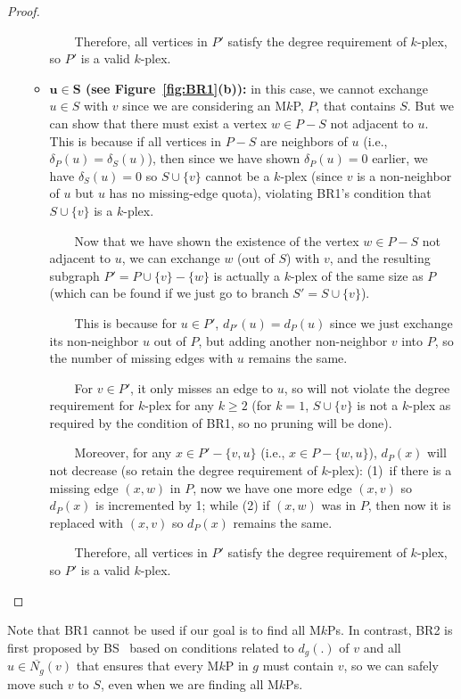 \documentclass[sigconf, nonacm]{acmart}
\begin{document}
\begin{proof}
\begin{itemize}
\begin{itemize}
\ \ \ \ Therefore, all vertices in $P'$ satisfy the degree requirement of $k$-plex, so $P'$ is a valid $k$-plex.

\item {\bf $\mathbf{u\in S}$ (see Figure~\ref{fig:BR1}(b)):} in this case, we cannot exchange $u\in S$ with $v$ since we are considering an M$k$P, $P$, that contains $S$. But we can show that there must exist a vertex $w\in P-S$ not adjacent to $u$. This is because if all vertices in $P-S$ are neighbors of $u$ (i.e., $\delta_P(u)=\delta_S(u)$), then since we have shown $\delta_P(u)=0$ earlier, we have $\delta_S(u)=0$ so $S\cup \{v\}$ cannot be a $k$-plex (since $v$ is a non-neighbor of $u$ but $u$ has no missing-edge quota), violating BR1's condition that $S\cup \{v\}$ is a $k$-plex.

\ \ \ \ Now that we have shown the existence of the vertex $w\in P-S$ not adjacent to $u$, we can exchange $w$ (out of $S$) with $v$, and the resulting subgraph $P'=P\cup \{v\}-\{w\}$ is actually a $k$-plex of the same size as $P$ (which can be found if we just go to branch $S'=S\cup\{v\}$).

\ \ \ \ This is because for $u\in P'$, $d_{P'}(u)=d_P(u)$ since we just exchange its non-neighbor $u$ out of $P$, but adding another non-neighbor $v$ into $P$, so the number of missing edges with $u$ remains the same.

\ \ \ \ For $v\in P'$, it only misses an edge to $u$, so will not violate the degree requirement for $k$-plex for any $k\geq 2$ (for $k=1$, $S\cup \{v\}$ is not a $k$-plex as required by the condition of BR1, so no pruning will be done).

\ \ \ \ Moreover, for any $x\in P'-\{v,u\}$ (i.e., $x\in P-\{w,u\}$), $d_P(x)$ will not decrease (so retain the degree requirement of $k$-plex): (1)~if there is a missing edge $(x, w)$ in $P$, now we have one more edge $(x, v)$ so $d_P(x)$ is incremented by 1; while (2) if $(x, w)$ was in $P$, then now it is replaced with $(x, v)$ so $d_P(x)$ remains the same.

\ \ \ \ Therefore, all vertices in $P'$ satisfy the degree requirement of $k$-plex, so $P'$ is a valid $k$-plex.

\end{itemize}
\end{itemize}
\end{proof}

Note that BR1 cannot be used if our goal is to find all M$k$Ps. In contrast, BR2 is first proposed by BS~\cite{BS} based on conditions related to $d_g(.)$ of $v$ and all $u\in\overline{N_g}(v)$ that ensures that every M$k$P in $g$ must contain $v$, so we can safely move such $v$ to $S$, even when we are finding all M$k$Ps.
\end{document}
